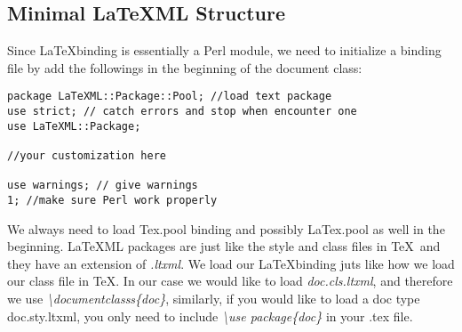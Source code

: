 \documentclass{book}
\begin{document}
\subsection{Minimal LaTeXML Structure}
Since \LaTeX binding is essentially a Perl module, we need to initialize a binding file by add the followings in the beginning of the document class:
\begin{lstlisting}
package LaTeXML::Package::Pool; //load text package 
use strict; // catch errors and stop when encounter one
use LaTeXML::Package;

//your customization here 

use warnings; // give warnings
1; //make sure Perl work properly 
\end{lstlisting}

We always need to load Tex.pool binding and possibly LaTex.pool as well in the beginning. \LaTeX ML packages are just like the 
style and class files in \TeX\  and they have an extension of \emph{.ltxml}. We load our \LaTeX binding juts like how we load our 
class file in \TeX . In our case we would like to load \emph{doc.cls.ltxml}, and therefore we use \emph{\textbackslash documentclasss\{doc\}},
similarly, if you would like to load a doc type doc.sty.ltxml, you only need to include \emph{\textbackslash use package\{doc\}} in your .tex 
file.
\end{document}
